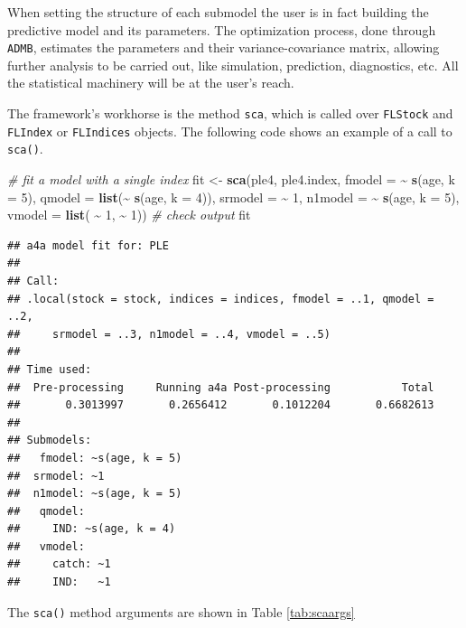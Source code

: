 \documentclass[
]{book}
\newenvironment{Shaded}{\begin{snugshade}}{\end{snugshade}}
\newcommand{\AttributeTok}[1]{\textcolor[rgb]{0.13,0.29,0.53}{#1}}
\newcommand{\CommentTok}[1]{\textcolor[rgb]{0.56,0.35,0.01}{\textit{#1}}}
\newcommand{\DecValTok}[1]{\textcolor[rgb]{0.00,0.00,0.81}{#1}}
\newcommand{\FunctionTok}[1]{\textcolor[rgb]{0.13,0.29,0.53}{\textbf{#1}}}
\newcommand{\NormalTok}[1]{#1}
\newcommand{\OtherTok}[1]{\textcolor[rgb]{0.56,0.35,0.01}{#1}}
\newcommand{\SpecialCharTok}[1]{\textcolor[rgb]{0.81,0.36,0.00}{\textbf{#1}}}
\begin{document}
When setting the structure of each submodel the user is in fact building the predictive model and its parameters. The optimization process, done through \texttt{ADMB}, estimates the parameters and their variance-covariance matrix, allowing further analysis to be carried out, like simulation, prediction, diagnostics, etc. All the statistical machinery will be at the user's reach.

The framework's workhorse is the method \texttt{sca}, which is called over \texttt{FLStock} and \texttt{FLIndex} or \texttt{FLIndices} objects. The following code shows an example of a call to \texttt{sca()}.

\begin{Shaded}
\begin{Highlighting}[]
\CommentTok{\# fit a model with a single index}
\NormalTok{fit }\OtherTok{\textless{}{-}} \FunctionTok{sca}\NormalTok{(ple4, ple4.index,}
    \AttributeTok{fmodel =} \SpecialCharTok{\textasciitilde{}} \FunctionTok{s}\NormalTok{(age, }\AttributeTok{k =} \DecValTok{5}\NormalTok{),}
    \AttributeTok{qmodel =} \FunctionTok{list}\NormalTok{(}\SpecialCharTok{\textasciitilde{}} \FunctionTok{s}\NormalTok{(age, }\AttributeTok{k =} \DecValTok{4}\NormalTok{)),}
    \AttributeTok{srmodel =} \SpecialCharTok{\textasciitilde{}} \DecValTok{1}\NormalTok{,}
    \AttributeTok{n1model =} \SpecialCharTok{\textasciitilde{}} \FunctionTok{s}\NormalTok{(age, }\AttributeTok{k =} \DecValTok{5}\NormalTok{),}
    \AttributeTok{vmodel =} \FunctionTok{list}\NormalTok{( }\SpecialCharTok{\textasciitilde{}} \DecValTok{1}\NormalTok{, }\SpecialCharTok{\textasciitilde{}} \DecValTok{1}\NormalTok{))}
\CommentTok{\# check output}
\NormalTok{fit}
\end{Highlighting}
\end{Shaded}

\begin{verbatim}
## a4a model fit for: PLE 
## 
## Call:
## .local(stock = stock, indices = indices, fmodel = ..1, qmodel = ..2, 
##     srmodel = ..3, n1model = ..4, vmodel = ..5)
## 
## Time used:
##  Pre-processing     Running a4a Post-processing           Total 
##       0.3013997       0.2656412       0.1012204       0.6682613 
## 
## Submodels:
##   fmodel: ~s(age, k = 5)
##  srmodel: ~1
##  n1model: ~s(age, k = 5)
##   qmodel:
##     IND: ~s(age, k = 4)
##   vmodel:
##     catch: ~1
##     IND:   ~1
\end{verbatim}

The \texttt{sca()} method arguments are shown in Table \ref{tab:scaargs}
\end{document}
